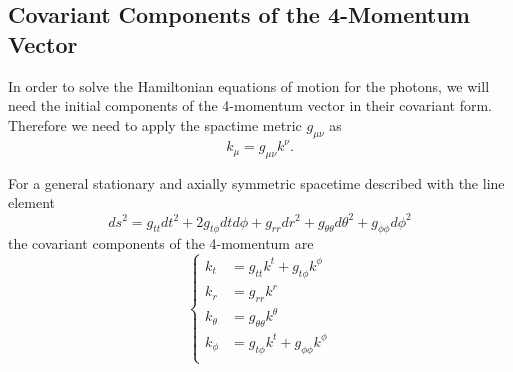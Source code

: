 \subsection{Covariant Components of the 4-Momentum Vector}
In order to solve the Hamiltonian equations of motion for the photons, we will need the initial components of the 4-momentum vector in their covariant form. Therefore we need to apply the spactime metric $g_{\mu \nu}$ as
\begin{equation}
k_\mu = g_{\mu \nu} k^\nu.
\end{equation}

For a general stationary and axially symmetric spacetime described with the line element
\begin{equation}
ds^2 = g_{tt} dt^2 + 2g_{t \phi} dt d\phi + g_{rr} dr^2 + g_{\theta \theta} d\theta^2 + g_{\phi \phi} d\phi^2
\end{equation}
the covariant components of the 4-momentum are
\begin{equation}
\begin{cases}
k_t &= g_{tt} k^t + g_{t \phi} k^\phi\\
k_r &= g_{rr} k^r \\
k_\theta &= g_{\theta \theta} k^\theta \\
k_\phi &=  g_{t \phi} k^t + g_{\phi \phi} k^\phi\\
\end{cases}
\end{equation}





